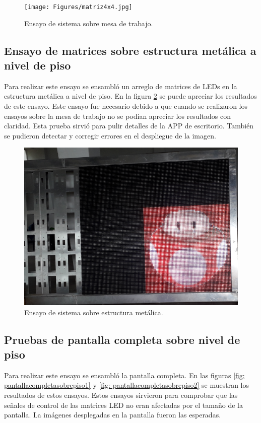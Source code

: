 \begin{figure}[htpb]
	\centering
	\texttt{[image: Figures/matriz4x4.jpg]} 
	\caption{Ensayo de sistema sobre mesa de trabajo.}
	\label{fig: matriz4x4}
\end{figure}

\subsection{Ensayo de matrices sobre estructura metálica a nivel de piso}
Para realizar este ensayo se ensambló un arreglo de matrices de LEDs en la estructura metálica a nivel de piso. En la figura \ref{fig: matrizestructuraparcial} se puede apreciar los resultados de este ensayo. Este ensayo fue necesario debido a que cuando se realizaron los ensayos sobre la mesa de trabajo no se podían apreciar los resultados con claridad. Esta prueba sirvió para pulir detalles de la APP de escritorio. También se pudieron detectar y corregir errores en el despliegue de la imagen.

\begin{figure}[htpb]
	\centering
	\includegraphics[scale=0.1]{Figures/matrizsobreestructura.jpg} 
	\caption{Ensayo de sistema sobre estructura metálica.}
	\label{fig: matrizestructuraparcial}
\end{figure}

\subsection{Pruebas de pantalla completa sobre nivel de piso}
Para realizar este ensayo se ensambló la pantalla completa. En las figuras \ref{fig: pantallacompletasobrepiso1} y \ref{fig: pantallacompletasobrepiso2} se muestran los resultados de estos ensayos. Estos ensayos sirvieron para comprobar que las señales de control de las matrices LED no eran afectadas por el tamaño de la pantalla. La imágenes desplegadas en la pantalla fueron las esperadas.

